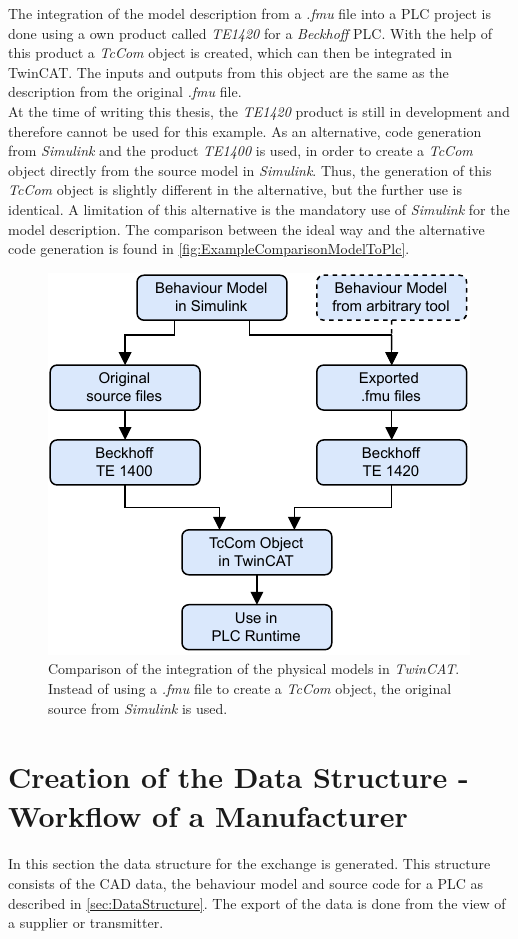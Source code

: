     	
    The integration of the model description from a \textit{.fmu} file into a PLC project is done using a own product called \textit{TE1420} for a \textit{Beckhoff} PLC. With the help of this product a \textit{TcCom} object is created, which can then be integrated in TwinCAT. The inputs and outputs from this object are the same as the description from the original \textit{.fmu} file. \\
    At the time of writing this thesis, the \textit{TE1420} product is still in development and therefore cannot be used for this example. As an alternative, code generation from \textit{Simulink} and the product \textit{TE1400} is used, in order to create a \textit{TcCom} object directly from the source model in \textit{Simulink}. Thus, the generation of this \textit{TcCom} object is slightly different in the alternative, but the further use is identical. A limitation of this alternative is the mandatory use of \textit{Simulink} for the model description. The comparison between the ideal way and the alternative code generation is found in \autoref{fig:ExampleComparisonModelToPlc}.
 	\begin{figure}[htp]
		\centering
		\includegraphics[width=0.5\linewidth]{figures/ComparisonIncludeFmu.pdf}
		\caption[Comparison of the integration of the physical models in \textit{TwinCAT}.]{Comparison of the integration of the physical models in \textit{TwinCAT}. Instead of using a \textit{.fmu} file to create a \textit{TcCom} object, the original source from \textit{Simulink} is used.}
		\label{fig:ExampleComparisonModelToPlc}
	\end{figure}
	
	
\section{Creation of the Data Structure - Workflow of a Manufacturer}	    \label{sec:ExampleCreateDataStructure}
    In this section the data structure for the exchange is generated. This structure consists of the CAD data, the behaviour model and source code for a PLC as described in \autoref{sec:DataStructure}. The export of the data is done from the view of a supplier or transmitter. \\
    
